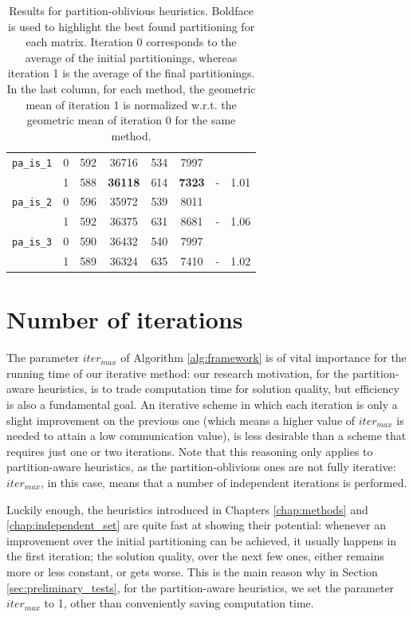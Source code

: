 \begin{table}[H]
\begin{tabular}{|l|c||c|c|c|c|c||c|}
		\verb|pa_is_1| & 0 & 592 & 36716 & 534 & 7997 & & \\ %
		& 1 & 588 & \textbf{36118} & 614 & \textbf{7323} & - & 1.01 \\ \hline %

		\verb|pa_is_2| & 0 & 596 & 35972 &  539 & 8011 &  & \\ %
		& 1 & 592 & 36375 &  631 & 8681 & - & 1.06 \\ \hline %

		\verb|pa_is_3| & 0 & 590 & 36432 & 540 & 7997 & & \\ %
		& 1 & 589 & 36324 & 635 & 7410 & - & 1.02\\ \hline %

	\end{tabular}
	\caption{Results for partition-oblivious heuristics. Boldface is used to highlight the best found partitioning for each matrix. Iteration 0 corresponds to the average of the initial partitionings, whereas iteration 1 is the average of the final partitionings. In the last column, for each method, the geometric mean of iteration 1 is normalized w.r.t. the geometric mean of iteration 0 for the same method.} \label{tab:preliminary_pa}
\end{table}


\section{Number of iterations} \label{sec:iter_max}

The parameter $iter_{max}$ of Algorithm \ref{alg:framework} is of vital importance for the running time of our iterative method: our research motivation, for the partition-aware heuristics, is to trade computation time for solution quality, but efficiency is also a fundamental goal. An iterative scheme in which each iteration is only a slight improvement on the previous one (which means a higher value of $iter_{max}$ is needed to attain a low communication value), is less desirable than a scheme that requires just one or two iterations. Note that this reasoning only applies to partition-aware heuristics, as the partition-oblivious ones are not fully iterative: $iter_{max}$, in this case, means that a number of independent iterations is performed.

Luckily enough, the heuristics introduced in Chapters \ref{chap:methods} and \ref{chap:independent_set} are quite fast at showing their potential: whenever an improvement over the initial partitioning can be achieved, it usually happens in the first iteration; the solution quality, over the next few ones, either remains more or less constant, or gets worse. This is the main reason why in Section \ref{sec:preliminary_tests}, for the partition-aware heuristics, we set the parameter $iter_{max}$ to 1, other than conveniently saving computation time.

